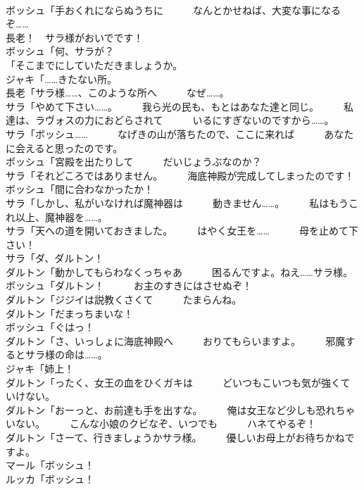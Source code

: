 \documentclass[8pt]{extreport}
\begin{document}
\begin{CJK}{UTF8}{min}
\\	ボッシュ「手おくれにならぬうちに　　　なんとかせねば、大変な事になるぞ……	
\\	長老！　サラ様がおいでです！	
\\	ボッシュ「何、サラが？	
\\	「そこまでにしていただきましょうか。	
\\	ジャキ「……きたない所。	
\\	長老「サラ様……、このような所へ　　　なぜ……。	
\\	サラ「やめて下さい……。　　　我ら光の民も、もとはあなた達と同じ。　　　私達は、ラヴォスの力におどらされて　　　いるにすぎないのですから……。	
\\	サラ「ボッシュ……　　　なげきの山が落ちたので、ここに来れば　　　あなたに会えると思ったのです。	
\\	ボッシュ「宮殿を出たりして　　　だいじょうぶなのか？	
\\	サラ「それどころではありません。　　　海底神殿が完成してしまったのです！	
\\	ボッシュ「間に合わなかったか！	
\\	サラ「しかし、私がいなければ魔神器は　　　動きません……。　　　私はもうこれ以上、魔神器を……。	
\\	サラ「天への道を開いておきました。　　　はやく女王を……　　　母を止めて下さい！	
\\	サラ「ダ、ダルトン！	
\\	ダルトン「動かしてもらわなくっちゃあ　　　困るんですよ。ねえ……サラ様。	
\\	ボッシュ「ダルトン！　　　お主のすきにはさせぬぞ！	
\\	ダルトン「ジジイは説教くさくて　　　たまらんね。	
\\	ダルトン「だまっちまいな！	
\\	ボッシュ「ぐはっ！	
\\	ダルトン「さ、いっしょに海底神殿へ　　　おりてもらいますよ。　　　邪魔するとサラ様の命は……。	
\\	ジャキ「姉上！	
\\	ダルトン「ったく、女王の血をひくガキは　　　どいつもこいつも気が強くて　　　いけない。	
\\	ダルトン「おーっと、お前達も手を出すな。　　　俺は女王など少しも恐れちゃいない。　　　こんな小娘のクビなぞ、いつでも　　　ハネてやるぞ！	
\\	ダルトン「さーて、行きましょうかサラ様。　　　優しいお母上がお待ちかねですよ。	
\\	マール「ボッシュ！	
\\	ルッカ「ボッシュ！	

\end{CJK}
\end{document}
